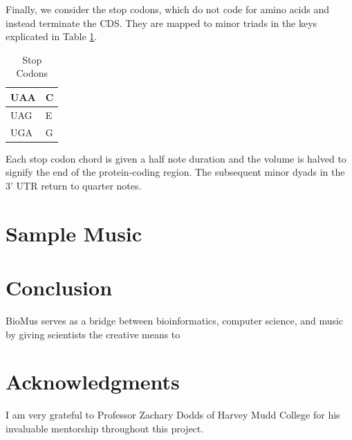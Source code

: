 \documentclass[letterpaper]{article}
\begin{document}
Finally, we consider the stop codons, which do not code for amino acids and instead terminate the CDS. They are mapped to minor triads in the keys explicated in Table \ref{table:stop_codons}. 

\begin{table}[h!]
\centering
\begin{tabular}{|l|l|}
\hline
UAA & C \\ \hline
UAG & E \\ \hline
UGA & G \\ \hline
\end{tabular}
\caption{Stop Codons}
\label{table:stop_codons}
\end{table}

Each stop codon chord is given a half note duration and the volume is halved to signify the end of the protein-coding region. The subsequent minor dyads in the 3' UTR return to quarter notes. 

\section{Sample Music}

\section{Conclusion}
BioMus serves as a bridge between bioinformatics, computer science, and music by giving scientists the creative means to 


\section{Acknowledgments}

I am very grateful to Professor Zachary Dodds of Harvey Mudd College for his invaluable mentorship throughout this project.




\end{document}
